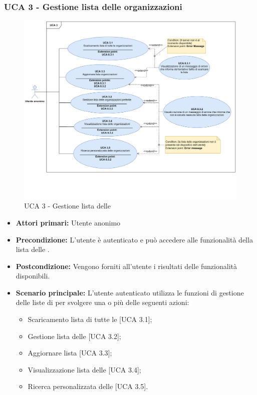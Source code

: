 \subsubsection{UCA 3 - Gestione lista delle organizzazioni}%
\begin{figure}[h!]
	\centering
	\includegraphics[scale=0.49, center]{Sezioni/UseCase/Immagini/UCA3.png}
	\caption{UCA 3 - Gestione lista delle }
\end{figure} 

\begin{itemize}
\item \textbf{Attori primari:} Utente anonimo
\item \textbf{Precondizione:} L'utente è autenticato e può accedere alle funzionalità della lista delle .
\item \textbf{Postcondizione:} Vengono forniti all'utente i risultati delle funzionalità disponibili.
\item \textbf{Scenario principale:} L'utente autenticato utilizza le funzioni di gestione delle liste di  per svolgere una o più delle seguenti azioni:
	\begin{itemize}
		\item Scaricamento lista di tutte le  [UCA 3.1];
		\item Gestione lista delle  [UCA 3.2];
		\item Aggiornare lista  [UCA 3.3];
		\item Visualizzazione lista delle  [UCA 3.4];
		\item Ricerca personalizzata delle  [UCA 3.5].
	\end{itemize}
\end{itemize}


